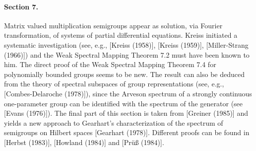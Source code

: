 \paragraph{Section 7.} Matrix valued multiplication semigroups appear as solution, via Fourier transformation, of systems of partial differential equations.
Kreiss initiated a systematic investigation (see, e.g., [Kreiss (1958)], [Kreiss (1959)], [Miller-Strang (1966)]) and the Weak Spectral Mapping Theorem 7.2 must have been known to him. The direct proof of the Weak Spectral Mapping Theorem 7.4 for polynomially bounded groups seems to be new. The result can also be deduced from the theory of spectral subspaces of group representations (see, e.g., [Combes-Delaroche (1978)]), since the Arveson spectrum of a strongly continuous one-parameter group can be identified with the spectrum of the generator (see [Evans (1976)]). The final part of this section is taken from [Greiner (1985)] and yields a new approach to Gearhart's characterization of the spectrum of semigroups on Hilbert spaces [Gearhart (1978)]. Different proofs can be found in [Herbst (1983)], [Howland (1984)] and [Prüß (1984)].



